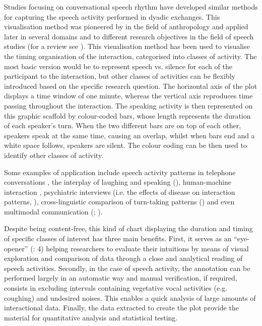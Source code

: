 Studies focusing on conversational speech rhythm have developed similar methods for capturing the speech activity performed in dyadic exchanges. This visualisation method was pioneered by \citet{Chapple1939} in the field of anthropology and applied later in several domains and to different research objectives in the field of speech studies (for a review see \citealt{CangemiEtAl2023}). This visualisation method has been used to visualise the timing organisation of the interaction, categorised into classes of activity. The most basic version would be to represent speech vs. silence for each of the participant to the interaction, but other classes of activities can be flexibly introduced based on the specific research question. The horizontal axis of the plot displays a time window of one minute, whereas the vertical axis reproduces time passing throughout the interaction. The speaking activity is then represented on this graphic scaffold by colour-coded bars, whose length represents the duration of each speaker’s turn. When the two different bars are on top of each other, speakers speak at the same time, causing an overlap, whilst when bars end and a white space follows, speakers are silent. The colour coding can be then used to identify other classes of activity.

Some examples of application include speech activity patterns in telephone conversations \citep{Campbell2007}, the interplay of laughing and speaking (\citealt{TrouvainTruong2013}), human-machine interaction \citep{GilmartinEtAl2018}, psychiatric interviews (i.e. the effects of disease on interaction patterns, \citealt{CangemiEtAl2023}), cross-linguistic comparison of turn-taking patterns (\citealt{DingemanseLiesenfeld2022}) and even multimodal communication (\citealt{RühlemannPtak2023}; \citealt{SpaniolEtAl2023}). 

Despite being content-free, this kind of chart displaying the duration and timing of specific classes of interest has three main benefits. First, it serves as an “eye-opener” (\citealt{TrouvainTruong2013}: 4) helping researchers to evaluate their intuitions by means of visual exploration and comparison of data through a close and analytical reading of speech activities. Secondly, in the case of speech activity, the annotation can be performed largely in an automatic way and manual verification, if required, consists in excluding intervals containing vegetative vocal activities (e.g. coughing) and undesired noises. This enables a quick analysis of large amounts of interactional data. Finally, the data extracted to create the plot provide the material for quantitative analysis and statistical testing. 

